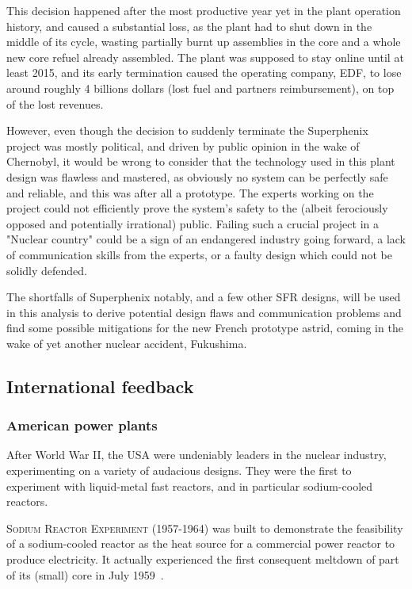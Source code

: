 This decision happened after the most productive year yet in the plant operation history, and caused a substantial loss, as the plant had to shut down in the middle of its cycle, wasting partially burnt up assemblies in the core and a whole new core refuel already assembled. The plant was supposed to stay online until at least 2015, and its early termination caused the operating company, EDF, to lose around roughly 4 billions dollars (lost fuel and partners reimbursement), on top of the lost revenues.

However, even though the decision to suddenly terminate the Superphenix project was mostly political, and driven by public opinion in the wake of Chernobyl, it would be wrong to consider that the technology used in this plant design was flawless and mastered, as obviously no system can be perfectly safe and reliable, and this was after all a prototype. The experts working on the project could not efficiently prove the system's safety to the (albeit ferociously opposed and potentially irrational) public. Failing such a crucial project in a "Nuclear country" could be a sign of an endangered industry going forward, a lack of communication skills from the experts, or a faulty design which could not be solidly defended.


The shortfalls of Superphenix notably, and a few other SFR designs, will be used in this analysis to derive potential design flaws and communication problems and find some possible mitigations for the new French prototype \gls{astrid}, coming in the wake of yet another nuclear accident, Fukushima.


\subsection{International feedback}
\label{subsec1:feedback}


\subsubsection{American power plants}
\label{subsubsec1:usa}

After World War II, the USA were undeniably leaders in the nuclear industry, experimenting on a variety of audacious designs. They were the first to experiment with liquid-metal fast reactors, and in particular sodium-cooled reactors.

\textsc{Sodium Reactor Experiment} (1957-1964) was built to demonstrate the feasibility of a sodium-cooled reactor as the heat source for a commercial power reactor to produce electricity. It actually
experienced the first consequent meltdown of part of its (small) core in July 1959~\cite{ashley01}.

